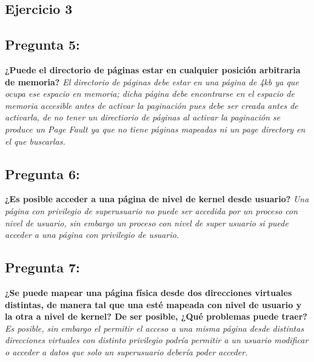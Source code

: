 \documentclass[10pt, a4paper]{article}
\begin{document}
\subsection{Ejercicio 3}
{\subsection{Pregunta 5:}} \textbf{¿Puede el directorio de páginas estar en cualquier posición arbitraria de memoria?}\newline
\newline
\textit{
	El directorio de p\'aginas debe estar en una p\'agina de 4kb ya que ocupa ese espacio en memoria; dicha p\'agina debe encontrarse en el espacio de memoria accesible antes de activar la paginaci\'on pues debe ser creada antes de activarla, de no tener un directiorio de p\'aginas al activar la paginaci\'on se produce un Page Fault ya que no tiene p\'aginas mapeadas ni un page directory en el que buscarlas.
}
{\subsection{Pregunta 6:}} \textbf{¿Es posible acceder a una página de nivel de kernel desde usuario?}\newline
\newline
\textit{
	Una p\'agina con privilegio de superusuario no puede ser accedida por un proceso con nivel de usuario, sin embargo un proceso con nivel de super usuario si puede acceder a una p\'agina con privilegio de usuario.
}

{\subsection{Pregunta 7:}} \textbf{¿Se puede mapear una página física desde dos direcciones virtuales
distintas, de manera tal que una esté mapeada con nivel de usuario y la otra a nivel de kernel? De ser posible, ¿Qué problemas puede traer?}\newline
\newline
\textit{
	Es posible, sin embargo el permitir el acceso a una misma p\'agina desde distintas direcciones virtuales con distinto privilegio podr\'ia permitir a un usuario modificar o acceder a datos que solo un superusuario deber\'ia poder acceder.
}
\end{document}
